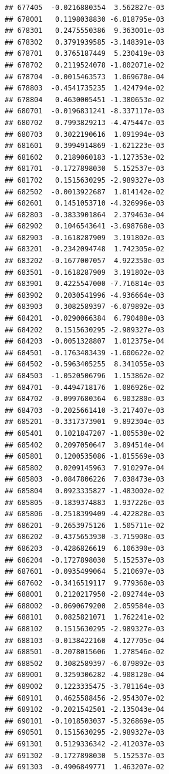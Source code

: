 \documentclass[ignorenonframetext,]{beamer}
\begin{document}
\begin{frame}[fragile]
\begin{verbatim}
## 677405  -0.0216880354  3.562827e-03
## 678001   0.1198038830 -6.818795e-03
## 678301   0.2475550386  9.363001e-03
## 678302   0.3791939585 -3.148391e-03
## 678701   0.3765187449  5.230419e-03
## 678702   0.2119524078 -1.802071e-02
## 678704  -0.0015463573  1.069670e-04
## 678803  -0.4541735235  1.424794e-02
## 678804   0.4630005451 -1.380653e-02
## 680701  -0.0196831241 -8.337117e-03
## 680702   0.7993829213 -4.475447e-03
## 680703   0.3022190616  1.091994e-03
## 681601   0.3994914869 -1.621223e-03
## 681602   0.2189060183 -1.127353e-02
## 681701  -0.1727898030  5.152537e-03
## 681702   0.1515630295 -2.989327e-03
## 682502  -0.0013922687  1.814142e-02
## 682601   0.1451053710 -4.326996e-03
## 682803  -0.3833901864  2.379463e-04
## 682902   0.1046543641 -3.698768e-03
## 682903  -0.1618287909  3.191802e-03
## 683201  -0.2342094748  1.742305e-02
## 683202  -0.1677007057  4.922350e-03
## 683501  -0.1618287909  3.191802e-03
## 683901   0.4225547000 -7.716814e-03
## 683902   0.2030541996 -4.936664e-03
## 683903   0.3082589397 -6.079892e-03
## 684201  -0.0290066384  6.790488e-03
## 684202   0.1515630295 -2.989327e-03
## 684203  -0.0051328807  1.012375e-04
## 684501  -0.1763483439 -1.600622e-02
## 684502  -0.5963405255  8.341055e-03
## 684503  -1.0520506796  1.153862e-02
## 684701  -0.4494718176  1.086926e-02
## 684702  -0.0997680364  6.903280e-03
## 684703  -0.2025661410 -3.217407e-03
## 685201  -0.3317373901  9.892304e-03
## 685401   0.1021847207 -1.805538e-02
## 685402   0.2097050647  3.894514e-04
## 685801   0.1200535086 -1.815569e-03
## 685802   0.0209145963  7.910297e-04
## 685803  -0.0847806226  7.038473e-03
## 685804   0.0923335827 -1.483002e-02
## 685805  -0.1839374883  1.937226e-03
## 685806  -0.2518399409 -4.422828e-03
## 686201  -0.2653975126  1.505711e-02
## 686202  -0.4375653930 -3.715908e-03
## 686203  -0.4286826619  6.106390e-03
## 686204  -0.1727898030  5.152537e-03
## 687601  -0.0935499064  5.210697e-03
## 687602  -0.3416519117  9.779360e-03
## 688001   0.2120217950 -2.892744e-03
## 688002  -0.0690679200  2.059584e-03
## 688101   0.0825821071  1.762241e-02
## 688102   0.1515630295 -2.989327e-03
## 688103  -0.0138422160  4.127705e-04
## 688501  -0.2078015606  1.278546e-02
## 688502   0.3082589397 -6.079892e-03
## 689001   0.3259306282 -4.908120e-04
## 689002   0.1223335475 -3.781164e-03
## 689101   0.4625588456 -2.954307e-02
## 689102  -0.2021542501 -2.135043e-04
## 690101  -0.1018503037 -5.326869e-05
## 690501   0.1515630295 -2.989327e-03
## 691301   0.5129336342 -2.412037e-03
## 691302  -0.1727898030  5.152537e-03
## 691303  -0.4906849771  1.463207e-02

\end{verbatim}
\end{frame}
\end{document}
